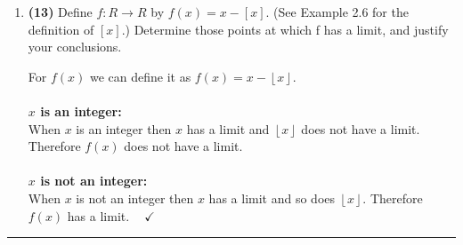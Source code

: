 \documentclass[fleqn]{article}
\begin{document}
\begin{enumerate}
    \item \textbf{(13)} Define $f: R \longrightarrow R$ by $f(x)=x-[x]$. (See Example 2.6 for the definition 
    of $[x]$.) Determine those points at which f has a limit, and justify your conclusions.

      \textcolor{hwColor}{
          For $f(x)$ we can define it as $f(x)=x-\left\lfloor x\right\rfloor$. 
          \\
          \\
          \textbf{$x$ is an integer:}
          \\
          When $x$ is an integer then $x$ has a limit and $\left\lfloor x\right\rfloor$ does not have a limit. 
          Therefore $f(x)$ does not have a limit.
          \\
          \\
          \textbf{$x$ is not an integer:}
          \\
          When $x$ is not an integer then $x$ has a limit and so does $\left\lfloor x\right\rfloor$. 
          Therefore $f(x)$ has a limit. $~~~~ \checkmark$
          \\
      }

  \end{enumerate}

  \rule{15cm}{2pt}
\end{document}
